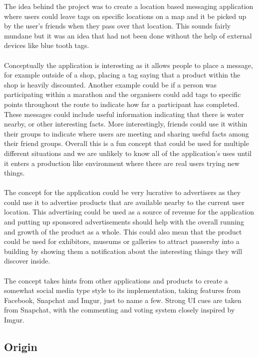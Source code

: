 The idea behind the project was to create a location based messaging application where users could leave tags on specific locations on a map and it be picked up by the user's friends when they pass over that location. This sounds fairly mundane but it was an idea that had not been done without the help of external devices like blue tooth tags.\\
\\
Conceptually the application is interesting as it allows people to place a message, for example outside of a shop, placing a tag saying that a product within the shop is heavily discounted. Another example could be if a person was participating within a marathon and the organisers could add tags to specific points throughout the route to indicate how far a participant has completed. These messages could include useful information indicating that there is water nearby, or other interesting facts. More interestingly, friends could use it within their groups to indicate where users are meeting and sharing useful facts among their friend groups. Overall this is a fun concept that could be used for multiple different situations and we are unlikely to know all of the application's uses until it enters a production like environment where there are real users trying new things.\\
\\
The concept for the application could be very lucrative to advertisers as they could use it to advertise products that are available nearby to the current user location. This advertising could be used as a source of revenue for the application and putting up sponsored advertisements should help with the overall running and growth of the product as a whole. This could also mean that the product could be used for exhibitors, museums or galleries to attract passersby into a building by showing them a notification about the interesting things they will discover inside.\\
\\
The concept takes hints from other applications and products to create a somewhat social media type style to its implementation, taking features from Facebook, Snapchat and Imgur, just to name a few. Strong UI cues are taken from Snapchat, with the commenting and voting system closely inspired by Imgur.

\subsection{Origin}

